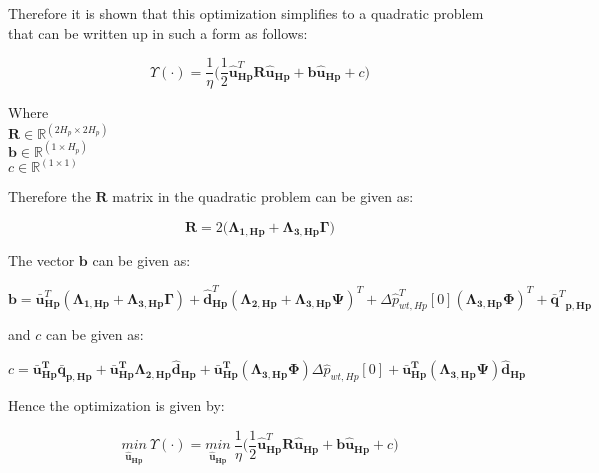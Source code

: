 Therefore it is shown that this optimization simplifies to a quadratic problem that can be written up in such a form as follows:

\begin{equation}
  \Upsilon(\cdot) = \frac{1}{\eta}\Big( \frac{1}{2} \bm{\hat{u}}_{\bm{Hp}}^{T} \bm{R} \bm{\hat{u}}_{\bm{Hp}} + \bm{b} \bm{\hat{u}}_{\bm{Hp}} + c \Big)
\end{equation}

\begin{minipage}[t]{0.28\textwidth}
Where\\
\hspace*{8mm} $\bm{R} \in \pmb{\mathbb{R}}^{(2 H_p \times 2 H_p)} $ \\
\hspace*{8mm} $\bm{b} \in \pmb{\mathbb{R}}^{(1 \times H_p)} $ \\
\hspace*{8mm} $c \in \mathbb{R}^{(1 \times 1)} $
\end{minipage}

Therefore the $\bm{R}$ matrix in the quadratic problem can be given as:

\begin{equation}
  \bm{R} = 2\Big(\bm{\Lambda}_{\bm{1,Hp}} + \bm{\Lambda}_{\bm{3,Hp}} \bm{\Gamma}\Big) 
\end{equation}

The vector $\bm{b}$ can be given as:

\begin{equation}
\!\! \bm{b} = \bm{\bar{u}}_{\bm{Hp}}^{T}(\bm{\Lambda}_{\bm{1,Hp}} \!+ \!\bm{\Lambda}_{\bm{3,Hp}} \bm{\Gamma} )\! + \!\bm{\hat{d}}_{\bm{Hp}}^{T}(\bm{\Lambda}_{\bm{2,Hp}}\! + \!\bm{\Lambda}_{\bm{3,Hp}} \bm{\Psi} )^{T}
  + \Delta \hat{p}_{wt,Hp}^{T}[0] (\bm{\Lambda}_{\bm{3,Hp}} \bm{\Phi})^{T} + {\bm{\bar{q}}^{T}}_{\bm{p,Hp}}
\end{equation}

and $c$ can be given as:

\begin{equation}
\!\! c = \bm{\bar{u}_{Hp}^T} \bm{\bar{q}_{p,Hp}} + \bm{\bar{u}_{Hp}^T} \bm{\Lambda}_{\bm{2,Hp}} \bm{\hat{d}}_{\bm{Hp}} +  \bm{\bar{u}_{Hp}^T} (\bm{\Lambda}_{\bm{3,Hp}} \bm{\Phi}) \Delta \hat{p}_{wt,Hp}[0] + \bm{\bar{u}_{Hp}^T} (\bm{\Lambda}_{\bm{3,Hp}} \bm{\Psi})  \bm{\hat{d}_{Hp}}
\end{equation}

Hence the optimization is given by:

\begin{equation}
\underset{\bm{\hat{u}_{Hp}}}{min} \:  \Upsilon(\cdot) = \underset{\bm{\hat{u}_{Hp}}}{min} \:  \frac{1}{\eta}\bigg( \frac{1}{2} \bm{\hat{u}}_{\bm{Hp}}^{T} \bm{R} \bm{\hat{u}}_{\bm{Hp}} + \bm{b} \bm{\hat{u}}_{\bm{Hp}} + c \bigg)
\label{eq:obj_final}
\end{equation}